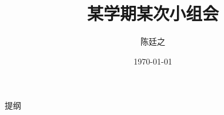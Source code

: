 \documentclass[slidestop,compress,mathserif]{beamer}
\title{某学期某次小组会}
\author{陈廷之}
\institute{某研究所}
\date{\today}
\begin{document}
\begin{frame}
  \titlepage{}
\end{frame}
\begin{frame}[t]{提纲}
  \tableofcontents
 \end{frame}
\end{document}

